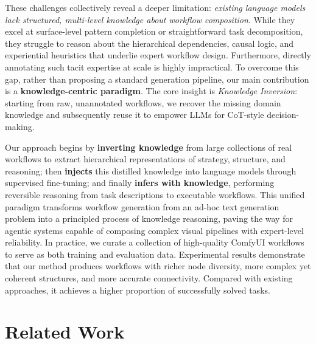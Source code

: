 \documentclass[runningheads]{llncs}
\begin{document}
These challenges collectively reveal a deeper limitation: \textit{existing language models lack structured, multi-level knowledge about workflow composition}.
%
While they excel at surface-level pattern completion or straightforward task decomposition, they struggle to reason about the hierarchical dependencies, causal logic, and experiential heuristics that underlie expert workflow design.
%
Furthermore, directly annotating such tacit expertise at scale is highly impractical.
%
To overcome this gap, rather than proposing a standard generation pipeline, our main contribution is a \textbf{knowledge-centric paradigm}.
%
The core insight is \emph{Knowledge Inversion}: starting from raw, unannotated workflows, we recover the missing domain knowledge and subsequently reuse it to empower LLMs for CoT-style decision-making.


Our approach begins by \textbf{inverting knowledge} from large collections of real workflows to extract hierarchical representations of strategy, structure, and reasoning;
then \textbf{injects} this distilled knowledge into language models through supervised fine-tuning;
and finally \textbf{infers with knowledge}, performing reversible reasoning from task descriptions to executable workflows.
%
This unified paradigm transforms workflow generation from an ad-hoc text generation problem into a principled process of knowledge reasoning, paving the way for agentic systems capable of composing complex visual pipelines with expert-level reliability.
%
In practice, we curate a collection of high-quality ComfyUI workflows to serve as both training and evaluation data.
%
Experimental results demonstrate that our method produces workflows with richer node diversity, more complex yet coherent structures, and more accurate connectivity.
%
Compared with existing approaches, it achieves a higher proportion of successfully solved tasks.
\section{Related Work}
\end{document}
